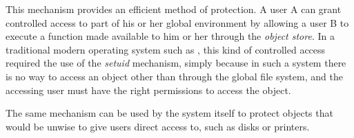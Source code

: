 This mechanism provides an efficient method of protection.  A user A
can grant controlled access to part of his or her global environment
by allowing a user B to execute a function made available to him or
her through the \emph{object store}.   In a
traditional modern operating system such as \unix{}, this kind of
controlled access required the use of the \emph{setuid} mechanism,
simply because in such a system there is no way to access an object
other than through the global file system, and the accessing user must
have the right permissions to access the object.

The same mechanism can be used by the system itself to protect objects
that would be unwise to give users direct access to, such as disks or
printers. 

